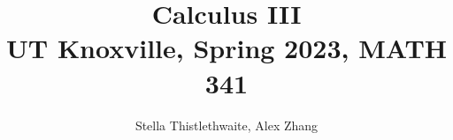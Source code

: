\documentclass[math]{amznotes}
\title{\textbf{Calculus III}\\
\large UT Knoxville, Spring 2023, MATH 341}
\author{Stella Thistlethwaite, Alex Zhang}
\begin{document}
\maketitle
\tableofcontents




\amzindex
\end{document}
